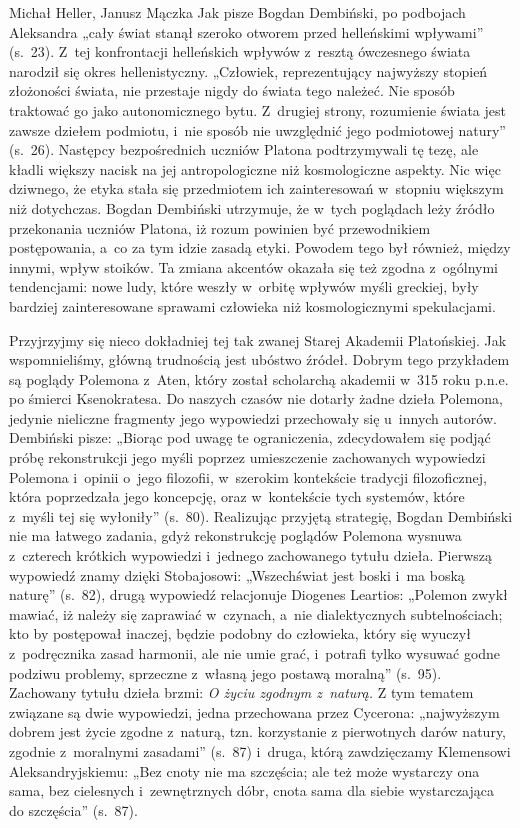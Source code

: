 \begin{recplenv}{Michał Heller, Janusz Mączka}
Jak pisze Bogdan Dembiński, po podbojach Aleksandra „cały świat stanął szeroko
otworem przed helleńskimi wpływami” (s.~23). Z~tej konfrontacji helleńskich wpływów z~resztą ówczesnego świata narodził
się okres hellenistyczny. „Człowiek, reprezentujący najwyższy stopień złożoności świata, nie przestaje nigdy do świata
tego należeć. Nie sposób traktować go jako autonomicznego bytu. Z~drugiej strony, rozumienie świata jest zawsze dziełem
podmiotu, i~nie sposób nie uwzględnić jego podmiotowej natury” (s.~26). Następcy bezpośrednich uczniów Platona
podtrzymywali tę tezę, ale kładli większy nacisk na jej antropologiczne niż kosmologiczne aspekty. Nic więc dziwnego,
że etyka stała się przedmiotem ich zainteresowań w~stopniu większym niż dotychczas. Bogdan Dembiński utrzymuje, że
 w~tych poglądach leży źródło przekonania uczniów Platona, iż rozum powinien być przewodnikiem postępowania, a~co za tym
idzie zasadą etyki. Powodem tego był również, między innymi, wpływ stoików. Ta zmiana akcentów okazała się też zgodna
 z~ogólnymi tendencjami: nowe ludy, które weszły w~orbitę wpływów myśli greckiej, były bardziej zainteresowane sprawami
człowieka niż kosmologicznymi spekulacjami.


Przyjrzyjmy się nieco dokładniej tej tak zwanej Starej Akademii Platońskiej. Jak
wspomnieliśmy, główną trudnością jest ubóstwo źródeł. Dobrym tego przykładem są poglądy
Polemona z~Aten, który został scholarchą akademii
w~315 roku p.n.e. po śmierci Ksenokratesa. Do naszych czasów nie dotarły żadne dzieła Polemona, jedynie nieliczne
fragmenty jego wypowiedzi przechowały się u~innych autorów. Dembiński pisze: „Biorąc pod uwagę te ograniczenia,
zdecydowałem się podjąć próbę rekonstrukcji jego myśli poprzez umieszczenie zachowanych wypowiedzi Polemona i~opinii
 o~jego filozofii, w~szerokim kontekście tradycji filozoficznej, która poprzedzała jego koncepcję, oraz w~kontekście tych
systemów, które z~myśli tej się wyłoniły” (s.~80). Realizując przyjętą strategię, Bogdan Dembiński nie ma łatwego
zadania, gdyż rekonstrukcję poglądów Polemona wysnuwa z~czterech krótkich wypowiedzi i~jednego zachowanego tytułu
dzieła. Pierwszą wypowiedź znamy dzięki Stobajosowi: „Wszechświat jest boski i~ma boską naturę” (s.~82), drugą
wypowiedź relacjonuje Diogenes Leartios: „Polemon zwykł mawiać, iż należy się zaprawiać w~czynach, a~nie dialektycznych
subtelnościach; kto by postępował inaczej, będzie podobny do człowieka, który się wyuczył z~podręcznika zasad harmonii,
ale nie umie grać, i~potrafi tylko wysuwać godne podziwu problemy, sprzeczne z~własną
jego postawą moralną” (s.~95). Zachowany tytułu dzieła brzmi: \textit{O życiu zgodnym z~naturą. }Z tym tematem związane
są dwie wypowiedzi, jedna przechowana przez Cycerona: „najwyższym dobrem jest życie zgodne z~naturą, tzn. korzystanie
z pierwotnych darów natury, zgodnie z~moralnymi zasadami” (s.~87) i~druga, którą zawdzięczamy Klemensowi
Aleksandryjskiemu: „Bez cnoty nie ma szczęścia; ale też może wystarczy ona sama, bez cielesnych i~zewnętrznych dóbr,
cnota sama dla siebie wystarczająca do szczęścia” (s.~87).



\end{recplenv}
